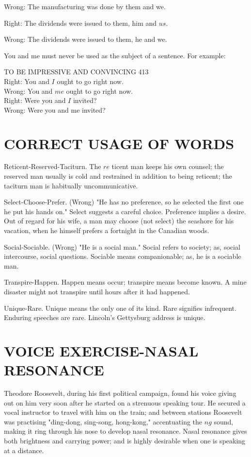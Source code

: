 \documentclass[10pt]{article}
\begin{document}
Wrong: The manufacturing was done by them and we.

Right: The dividends were issued to them, him and $u s$.

Wrong: The dividends were issued to them, he and we.

You and me must never be used as the subject of a sentence. For example:

TO BE IMPRESSIVE AND CONVINCING 413\\
Right: You and $I$ ought to go right now.\\
Wrong: You and $m e$ ought to go right now.\\
Right: Were you and $I$ invited?\\
Wrong: Were you and me invited?

\section*{CORRECT USAGE OF WORDS}
Reticent-Reserved-Taciturn. The $r e$ ticent man keeps his own counsel; the reserved man usually is cold and restrained in addition to being reticent; the taciturn man is habitually uncommunicative.

Select-Choose-Prefer. (Wrong) "He has no preference, so he selected the first one he put his hands on." Select suggests a careful choice. Preference implies a desire. Out of regard for his wife, a man may choose (not select) the seashore for his vacation, when he himself prefers a fortnight in the Canadian woods.

Social-Sociable. (Wrong) "He is a social man." Social refers to society; as, social intercourse, social questions. Sociable means companionable; as, he is a sociable man.

Transpire-Happen. Happen means occur; transpire means become known. A mine disaster might not transpire until hours after it had happened.

Unique-Rare. Unique means the only one of its kind. Rare signifies infrequent. Enduring speeches are rare. Lincoln's Gettysburg address is unique.

\section*{VOICE EXERCISE-NASAL RESONANCE}
Theodore Roosevelt, during his first political campaign, found his voice giving out on him very soon after he started on a strenuous speaking tour. He secured a vocal instructor to travel with him on the train; and between stations Roosevelt was practising "ding-dong, sing-song, hong-kong," accentuating the $n g$ sound, making it ring through his nose to develop nasal resonance. Nasal resonance gives both brightness and carrying power; and is highly desirable when one is speaking at a distance.
\end{document}
